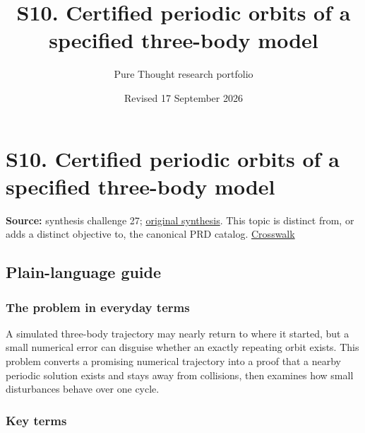 \documentclass[
  11pt,
]{article}
\title{S10. Certified periodic orbits of a specified three-body model}
\author{Pure Thought research portfolio}
\date{Revised 17 September 2026}
\begin{document}
\maketitle
\thispagestyle{empty}
\clearpage

\section{S10. Certified periodic orbits of a specified three-body model}

\textbf{Source:} synthesis challenge 27;
\href{https://github.com/rick-stevens-ai/Pure-Thought/blob/main/NOTES/30-Most-Compelling-Pure-Thought-AI-Challenges.md}{original
synthesis}. This topic is distinct from, or adds a distinct objective
to, the canonical PRD catalog.
\href{https://github.com/rick-stevens-ai/Pure-Thought/blob/main/reviews/SYNTHESIS-CROSSWALK.md}{Crosswalk}

\subsection{Plain-language guide}

\subsubsection{The problem in everyday terms}

A simulated three-body trajectory may nearly return to where it started,
but a small numerical error can disguise whether an exactly repeating
orbit exists. This problem converts a promising numerical trajectory
into a proof that a nearby periodic solution exists and stays away from
collisions, then examines how small disturbances behave over one cycle.

\subsubsection{Key terms}
\end{document}
